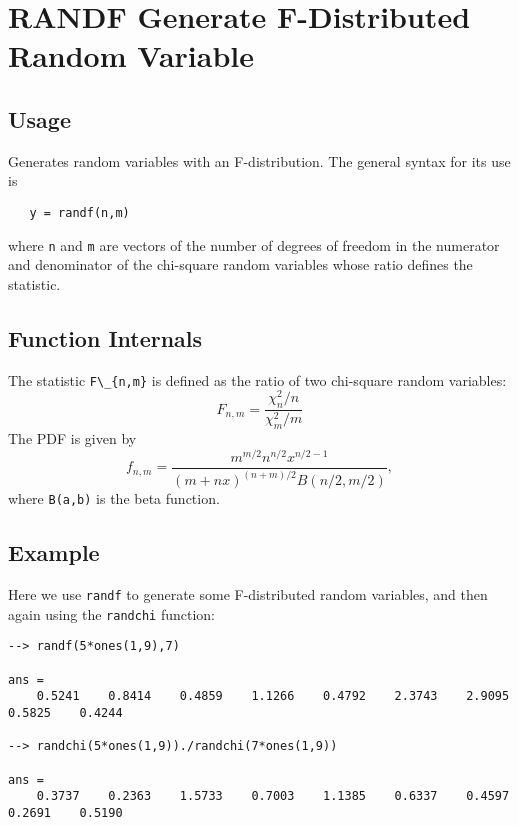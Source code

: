\section{RANDF Generate F-Distributed Random Variable}

\subsection{Usage}

Generates random variables with an F-distribution.  The general
syntax for its use is
\begin{verbatim}
   y = randf(n,m)
\end{verbatim}
where \verb|n| and \verb|m| are vectors of the number of degrees of freedom
in the numerator and denominator of the chi-square random variables
whose ratio defines the statistic.
\subsection{Function Internals}

The statistic \verb|F\_{n,m}| is defined as the ratio of two chi-square
random variables:
\[
  F_{n,m} = \frac{\chi_n^2/n}{\chi_m^2/m}
\]
The PDF is given by
\[
  f_{n,m} = \frac{m^{m/2}n^{n/2}x^{n/2-1}}{(m+nx)^{(n+m)/2}B(n/2,m/2)},
\]
where \verb|B(a,b)| is the beta function.
\subsection{Example}

Here we use \verb|randf| to generate some F-distributed random variables,
and then again using the \verb|randchi| function:
\begin{verbatim}
--> randf(5*ones(1,9),7)

ans = 
    0.5241    0.8414    0.4859    1.1266    0.4792    2.3743    2.9095    0.5825    0.4244 

--> randchi(5*ones(1,9))./randchi(7*ones(1,9))

ans = 
    0.3737    0.2363    1.5733    0.7003    1.1385    0.6337    0.4597    0.2691    0.5190 
\end{verbatim}
